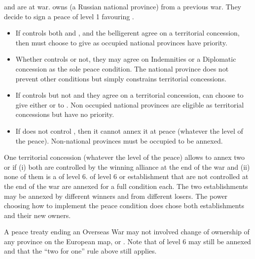 \begin{exemple}
  \SUE and \RUS are at war. \SUE owns \provinceNeva (a Russian national
  province) from a previous war. They decide to sign a peace of level 1
  favouring \RUS.
  \begin{itemize}
  \item If \RUS controls both \provinceNeva and \provinceKarelen, and the
    belligerent agree on a territorial concession, then \SUE must choose to
    give \provinceNeva as occupied national provinces have priority.
  \item Whether \RUS controls \provinceNeva or not, they may agree on
    Indemnities or a Diplomatic concession as the sole peace condition. The
    national province does not prevent other conditions but simply constrains
    territorial concessions.
  \item If \RUS controls \provinceKarelen but not \provinceNeva and they agree
    on a territorial concession, \SUE can choose to give either \provinceNeva
    or \provinceKarelen to \RUS. Non occupied national provinces are eligible
    as territorial concessions but have no priority.
  \item If \RUS does not control \provinceKarelen, then it cannot annex it at
    peace (whatever the level of the peace). Non-national provinces must be
    occupied to be annexed.
  \end{itemize}
\end{exemple}

\bparag One territorial concession (whatever the level of the peace) allows to
annex two \COL or \TP if (i) both are controlled by the winning alliance at
the end of the war and (ii) none of them is a \COL of level 6.
\bparag \COL of level 6 or establishment that are not controlled at the end of
the war are annexed for a full condition each.
\bparag The two establishments may be annexed by different winners and from
different losers.
\bparag The power choosing how to implement the peace condition does chose
both establishments and their new owners.

A peace treaty ending an Overseas War may not involved change of ownership of
any province on the European map,  or .
\bparag Note that \COL of level 6 may still be annexed and that the ``two for
one'' rule above still applies.

